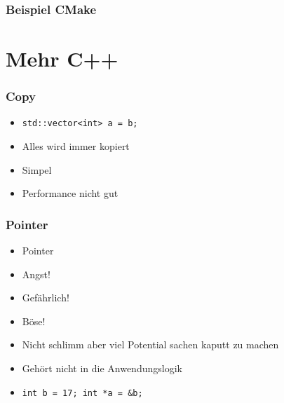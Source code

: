 \documentclass[aspectratio=169]{beamer}
\begin{document}
\begin{frame}
    \frametitle{Beispiel CMake}
\end{frame}


\section{Mehr C++}

\begin{frame}
    \frametitle{Copy}
    \begin{itemize}
        \item \lstinline{std::vector<int> a = b;}
            \pause
        \item Alles wird immer kopiert 
            \pause
        \item Simpel 
            \pause
        \item Performance nicht gut
    \end{itemize}
\end{frame}

\begin{frame}
    \frametitle{Pointer}
    \begin{itemize}
        \item Pointer 
            \pause
        \item Angst!
            \pause
        \item Gefährlich!
            \pause
        \item Böse!
            \pause
        \item Nicht schlimm aber viel Potential sachen kaputt zu machen
            \pause
        \item Gehört nicht in die Anwendungslogik
            \pause
        \item
            \lstinline{int b = 17; int *a = &b;}
    \end{itemize}
\end{frame}
\end{document}

